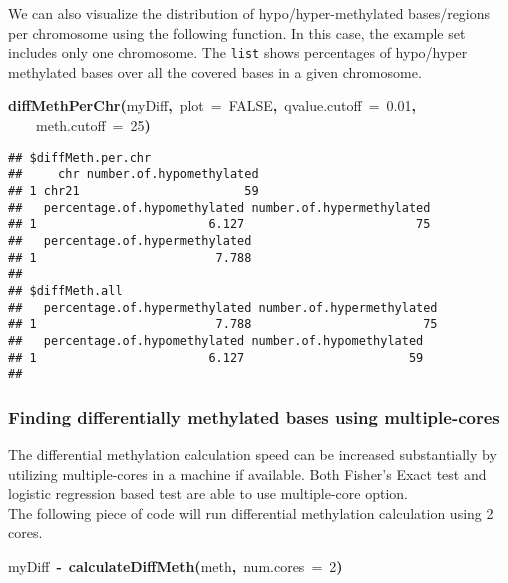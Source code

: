 \documentclass{article}
\makeatletter
\newcommand{\hlnumber}[1]{\textcolor[rgb]{0,0,0}{#1}}%
\newcommand{\hlfunctioncall}[1]{\textcolor[rgb]{.5,0,.33}{\textbf{#1}}}%
\newcommand{\hlkeyword}[1]{\textbf{#1}}%
\newcommand{\hlargument}[1]{\textcolor[rgb]{.69,.25,.02}{#1}}%
\newcommand{\hlassignement}[1]{\textbf{#1}}%
\newcommand{\hlsymbol}[1]{#1}%
\newcommand{\hlstd}[1]{\textcolor[rgb]{0,0,0}{#1}}%
\newenvironment{kframe}{%
 \def\FrameCommand##1{\hskip\@totalleftmargin \hskip-\fboxsep
 \colorbox{shadecolor}{##1}\hskip-\fboxsep
     \hskip-\linewidth \hskip-\@totalleftmargin \hskip\columnwidth}%
 \MakeFramed {\advance\hsize-\width
   \@totalleftmargin\z@ \linewidth\hsize
   \@setminipage}}%
 {\par\unskip\endMakeFramed}
\newenvironment{knitrout}{}{} %
\makeatother
\begin{document}
We can also visualize the distribution of hypo/hyper-methylated bases/regions per chromosome using the following function. In this case, the example set includes only one chromosome. The \texttt{list} shows percentages of hypo/hyper methylated bases over all the covered bases in a given chromosome.

 
\begin{knitrout}
\color{fgcolor}\begin{kframe}
\begin{flushleft}
\ttfamily\noindent
\hlfunctioncall{diffMethPerChr}\hlkeyword{(}\hlsymbol{myDiff}\hlkeyword{,}{\ }\hlargument{plot}{\ }\hlargument{=}{\ }\hlnumber{FALSE}\hlkeyword{,}{\ }\hlargument{qvalue.cutoff}{\ }\hlargument{=}{\ }\hlnumber{0.01}\hlkeyword{,}\hspace*{\fill}\\
\hlstd{}{\ }{\ }{\ }{\ }\hlargument{meth.cutoff}{\ }\hlargument{=}{\ }\hlnumber{25}\hlkeyword{)}\mbox{}
\normalfont
\end{flushleft}
\begin{verbatim}
## $diffMeth.per.chr
##     chr number.of.hypomethylated
## 1 chr21                       59
##   percentage.of.hypomethylated number.of.hypermethylated
## 1                        6.127                        75
##   percentage.of.hypermethylated
## 1                         7.788
## 
## $diffMeth.all
##   percentage.of.hypermethylated number.of.hypermethylated
## 1                         7.788                        75
##   percentage.of.hypomethylated number.of.hypomethylated
## 1                        6.127                       59
## 
\end{verbatim}
\end{kframe}
\end{knitrout}

 
\subsubsection{Finding differentially methylated bases using multiple-cores}
The differential methylation calculation speed can be increased substantially by utilizing multiple-cores in a machine if available. Both Fisher's Exact test and logistic regression based test are able to use multiple-core option.
\\
The following piece of code will run differential methylation calculation using 2 cores.

\begin{knitrout}
\color{fgcolor}\begin{kframe}
\begin{flushleft}
\ttfamily\noindent
\hlsymbol{myDiff}{\ }\hlassignement{\usebox{\hlnormalsizeboxlessthan}-}{\ }\hlfunctioncall{calculateDiffMeth}\hlkeyword{(}\hlsymbol{meth}\hlkeyword{,}{\ }\hlargument{num.cores}{\ }\hlargument{=}{\ }\hlnumber{2}\hlkeyword{)}\mbox{}
\normalfont
\end{flushleft}
\end{kframe}
\end{knitrout}
\end{document}

